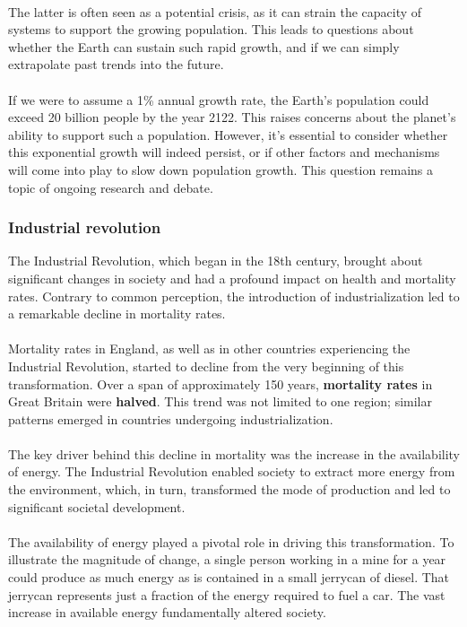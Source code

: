 \documentclass[../summary.tex]{subfiles}
\begin{document}
 \ \\
 The latter is often seen as a potential crisis, as it can strain the capacity of systems to support the growing population. This leads to questions about whether the Earth can sustain such rapid growth, and if we can simply extrapolate past trends into the future.\\
 \\
 If we were to assume a 1\% annual growth rate, the Earth's population could exceed 20 billion people by the year 2122. This raises concerns about the planet's ability to support such a population. However, it's essential to consider whether this exponential growth will indeed persist, or if other factors and mechanisms will come into play to slow down population growth. This question remains a topic of ongoing research and debate.

\subsubsection{Industrial revolution}

The Industrial Revolution, which began in the 18th century, brought about significant changes in society and had a profound impact on health and mortality rates. Contrary to common perception, the introduction of industrialization led to a remarkable decline in mortality rates.\\
\\
Mortality rates in England, as well as in other countries experiencing the Industrial Revolution, started to decline from the very beginning of this transformation. Over a span of approximately 150 years, \textbf{mortality rates} in Great Britain were \textbf{halved}. This trend was not limited to one region; similar patterns emerged in countries undergoing industrialization.\\
\\
The key driver behind this decline in mortality was the increase in the availability of energy. The Industrial Revolution enabled society to extract more energy from the environment, which, in turn, transformed the mode of production and led to significant societal development.\\
\\
The availability of energy played a pivotal role in driving this transformation. To illustrate the magnitude of change, a single person working in a mine for a year could produce as much energy as is contained in a small jerrycan of diesel. That jerrycan represents just a fraction of the energy required to fuel a car. The vast increase in available energy fundamentally altered society.
\end{document}
